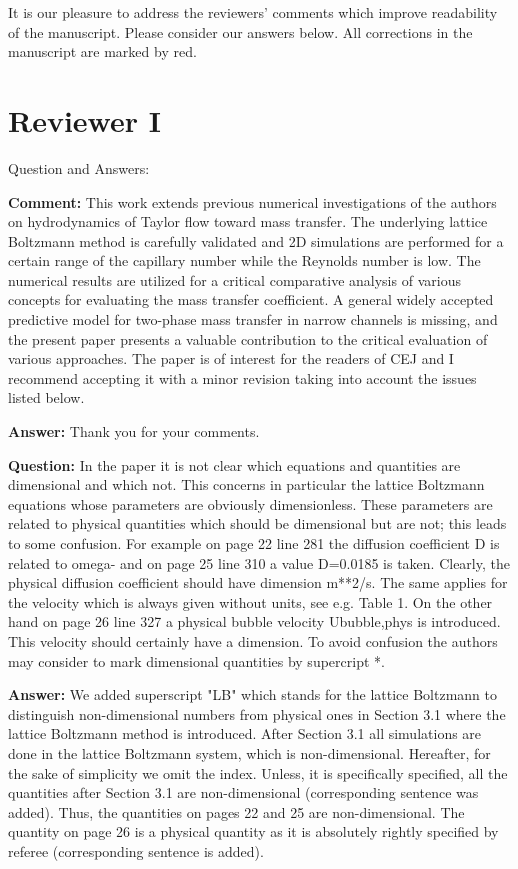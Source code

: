 \documentclass{article}
\begin{document}
It is our pleasure to address the reviewers' comments which improve readability of the manuscript.  Please consider our answers below. All corrections in the manuscript are marked by red.
\section{Reviewer I}

Question and Answers:

\textbf{Comment:}
This work extends previous numerical investigations of the authors on hydrodynamics of Taylor flow toward mass transfer. The underlying lattice Boltzmann method is carefully validated and 2D simulations are performed for a certain range of the capillary number while the Reynolds number is low. The numerical results are utilized for a critical comparative analysis of various concepts for evaluating the mass transfer coefficient. A general widely accepted predictive model for two-phase mass transfer in narrow channels is missing, and the present paper presents a valuable contribution to the critical evaluation of various approaches. The paper is of interest for the readers of CEJ and I recommend accepting it with a minor revision taking into account the issues listed below.

\textbf{Answer:} Thank you for your comments.

\textbf{Question:}  In the paper it is not clear which equations and quantities are dimensional and which not. This concerns in particular the lattice Boltzmann equations whose parameters are obviously dimensionless. These parameters are related to physical quantities which should be dimensional but are not; this leads to some confusion. For example on page 22 line 281 the diffusion coefficient D is related to omega- and on page 25 line 310 a value D=0.0185 is taken. Clearly, the physical diffusion coefficient should have dimension m**2/s. The same applies for the velocity which is always given without units, see e.g. Table 1. On the other hand on page 26 line 327 a physical bubble velocity Ububble,phys is introduced. This velocity should certainly have a dimension. To avoid confusion the authors may consider to mark dimensional quantities by supercript *.

\textbf{Answer:}  We added superscript "LB" which stands for the lattice Boltzmann to distinguish non-dimensional numbers from physical ones in Section 3.1 where the lattice Boltzmann method is introduced. After Section 3.1 all simulations are done in the lattice Boltzmann system, which is non-dimensional. Hereafter, for the sake of simplicity we omit the index. Unless, it is specifically specified, all the quantities after Section 3.1 are non-dimensional (corresponding sentence was added). Thus, the quantities on pages 22 and 25 are non-dimensional. The quantity on page 26 is a physical quantity as it is absolutely rightly specified by referee (corresponding sentence is added).
\end{document}
